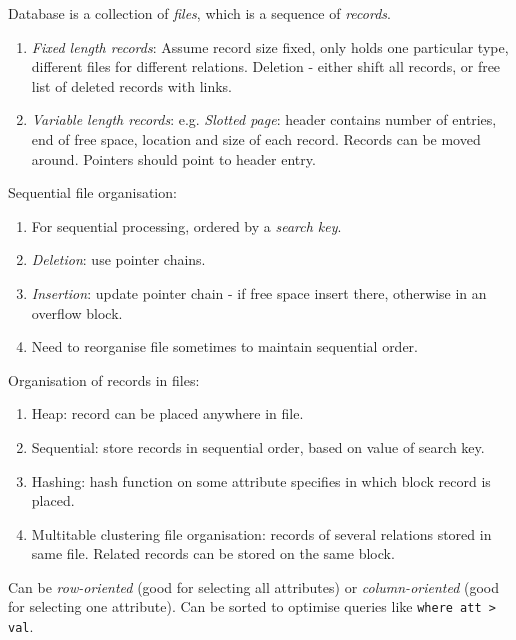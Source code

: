 \documentclass[twocolumn,english]{article}
\begin{document}
Database is a collection of \emph{files}, which is a sequence of \emph{records}.
\begin{enumerate}
\item \emph{Fixed length records}: Assume record size fixed, only holds
one particular type, different files for different relations. Deletion
- either shift all records, or free list of deleted records with links.
\item \emph{Variable length records}: e.g. \emph{Slotted page}: header contains
number of entries, end of free space, location and size of each record.
Records can be moved around. Pointers should point to header entry.
\end{enumerate}
Sequential file organisation:
\begin{enumerate}
\item For sequential processing, ordered by a \emph{search key}.
\item \emph{Deletion}: use pointer chains.
\item \emph{Insertion}: update pointer chain - if free space insert there,
otherwise in an overflow block.
\item Need to reorganise file sometimes to maintain sequential order.
\end{enumerate}
Organisation of records in files:
\begin{enumerate}
\item Heap: record can be placed anywhere in file.
\item Sequential: store records in sequential order, based on value of search
key.
\item Hashing: hash function on some attribute specifies in which block
record is placed.
\item Multitable clustering file organisation: records of several relations
stored in same file. Related records can be stored on the same block.
\end{enumerate}
Can be \emph{row-oriented} (good for selecting all attributes) or
\emph{column-oriented} (good for selecting one attribute). Can be
sorted to optimise queries like \texttt{where att \textgreater{} val}.
\end{document}
